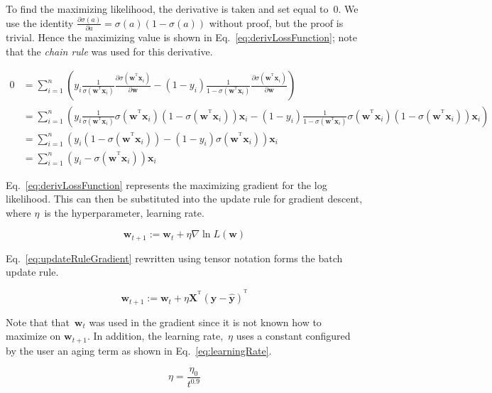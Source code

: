 \documentclass{report}
\newcommand{\xvec}{\mathbf{x}}
\newcommand{\xtensor}{\mathbf{X}}
\newcommand{\y}{\mathbf{y}}
\newcommand{\w}{\mathbf{w}}
\newcommand{\T}{^\textrm{T}}
\newcommand{\wTxi}{\w^{\T}\xvec_{i}}
\newcommand{\yhat}{\hat{\mathbf{y}}}
\begin{document}
  To find the maximizing likelihood, the derivative is taken and set equal to~$0$.  We use the identity ${\frac{\partial \sigma(a)}{\partial a} = \sigma(a)(1-\sigma(a))}$ without proof, but the proof is trivial. Hence the maximizing value is shown in Eq.~\eqref{eq:derivLossFunction}; note that the \textit{chain rule} was used for this derivative.
  
  \begin{align}
    0 &= \sum_{i=1}^{n} \left( y_i \frac{1}{\sigma(\wTxi)} \frac{\partial \sigma(\wTxi)}{\partial \w} - (1-y_i) \frac{1}{1-\sigma(\wTxi)} \frac{\partial \sigma(\wTxi)}{\partial \w} \right)\\
    &= \sum_{i=1}^{n} \left( y_i \frac{1}{\sigma(\wTxi)} \sigma(\wTxi)(1-\sigma(\wTxi))\xvec_i - (1-y_i) \frac{1}{1-\sigma(\wTxi)} \sigma(\wTxi)(1-\sigma(\wTxi))\xvec_i \right)\\
    &= \sum_{i=1}^{n} \left(y_i (1-\sigma(\wTxi)) - (1-y_i) \sigma(\wTxi) \right)\xvec_i\\
    &= \sum_{i=1}^{n} (y_i -\sigma(\wTxi))\xvec_i \label{eq:derivLossFunction}
  \end{align}
  
  Eq.~\eqref{eq:derivLossFunction} represents the maximizing gradient for the log likelihood.  This can then be substituted into the update rule for gradient descent, where $\eta$~is the hyperparameter, learning rate.
  
  \begin{equation}
    \w_{t+1}:=\w_{t}+\eta \nabla \ln L(\w)\label{eq:updateRuleGradient}
  \end{equation}
  
  \noindent
  Eq.~\eqref{eq:updateRuleGradient} rewritten using tensor notation forms the batch update rule.
  
 \begin{equation}
  \w_{t+1}:=\w_{t}+\eta \xtensor^{\T}(\y -\yhat)^{\T}\label{eq:finalUpdateRule}
 \end{equation}
  
  \noindent
  Note that that~$\w_{t}$ was used in the gradient since it is not known how to maximize on $\w_{t+1}$.  In addition, the learning rate,~$\eta$ uses a constant configured by the user an aging term as shown in Eq.~\eqref{eq:learningRate}.
   
  \begin{equation}
    \eta = \frac{\eta_0}{t^{0.9}}
    \label{eq:learningRate}
  \end{equation}
  
\end{document}
